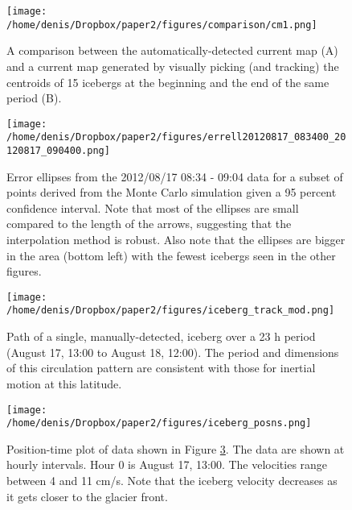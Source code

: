 \begin{figure}
\centering
\texttt{[image: /home/denis/Dropbox/paper2/figures/comparison/cm1.png]}
\caption[A comparison between the automatically-detected current map (A) and a current map generated by visually picking (and tracking) the centroids of 15 icebergs at the beginning and the end of the same period (B).]{A comparison between the automatically-detected current map (A) and a current map generated by visually picking (and tracking) the centroids of 15 icebergs at the beginning and the end of the same period (B).}
\label{fig:comparison}
\end{figure}



\begin{figure}
\centering
\texttt{[image: /home/denis/Dropbox/paper2/figures/errell20120817\_083400\_20120817\_090400.png]}
\caption[Error ellipses from the 2012/08/17 08:34 - 09:04 data for a subset of points derived from the Monte Carlo simulation given a 95 percent confidence interval.]{Error ellipses from the 2012/08/17 08:34 - 09:04 data for a subset of points derived from the Monte Carlo simulation given a 95 percent confidence interval. Note that most of the ellipses are small compared to the length of the arrows, suggesting that the interpolation method is robust. Also note that the ellipses are bigger in the area (bottom left) with the fewest icebergs seen in the other figures.}
\label{fig:ellipses}
\end{figure}


\begin{figure}
\centering
\texttt{[image: /home/denis/Dropbox/paper2/figures/iceberg\_track\_mod.png]}
\caption[Path of a single, manually-detected, iceberg over a 23 h period (August 17, 13:00 to August 18, 12:00).]{Path of a single, manually-detected, iceberg over a 23 h period (August 17, 13:00 to August 18, 12:00). The period and dimensions of this circulation pattern are consistent with those for inertial motion at this latitude.}
\label{fig:icebergpath}
\end{figure}

\begin{figure}
\centering
\texttt{[image: /home/denis/Dropbox/paper2/figures/iceberg\_posns.png]}
\caption[Position-time plot of data shown in Figure \ref{fig:icebergpath}.]{Position-time plot of data shown in Figure \ref{fig:icebergpath}. The data are shown at hourly intervals. Hour 0 is August 17, 13:00. The velocities range between 4 and 11 cm/s. Note that the iceberg velocity decreases as it gets closer to the glacier front.}
\label{fig:iceberg_times}
\end{figure}

